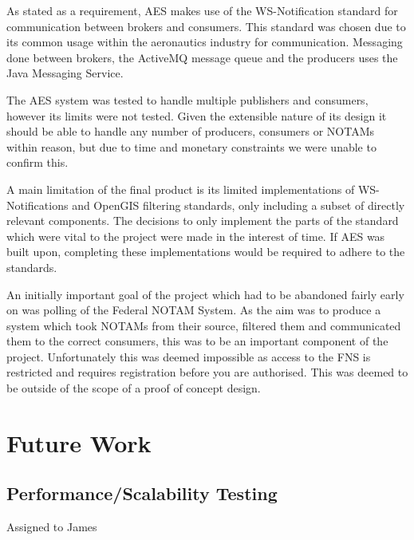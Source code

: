 \documentclass[a4paper, 12pt, twoside]{article}
\begin{document}
As stated as a requirement, AES makes use of the WS-Notification standard for communication between brokers and consumers. This standard was chosen due to its common usage within the aeronautics industry for communication. Messaging done between brokers, the ActiveMQ message queue and the producers uses the Java Messaging Service.

The AES system was tested to handle multiple publishers and consumers, however its limits were not tested. Given the extensible nature of its design it should be able to handle any number of producers, consumers or NOTAMs within reason, but due to time and monetary constraints we were unable to confirm this.

A main limitation of the final product is its limited implementations of WS-Notifications and OpenGIS filtering standards, only including a subset of directly relevant components. The decisions to only implement the parts of the standard which were vital to the project were made in the interest of time. If AES was built upon, completing these implementations would be required to adhere to the standards.

An initially important goal of the project which had to be abandoned fairly early on was polling of the Federal NOTAM System. As the aim was to produce a system which took NOTAMs from their source, filtered them and communicated them to the correct consumers, this was to be an important component of the project. Unfortunately this was deemed impossible as access to the FNS is restricted and requires registration before you are authorised. This was deemed to be outside of the scope of a proof of concept design.

\newpage

\section{Future Work}
\label{sec:future_work}

\subsection{Performance/Scalability Testing}
\label{sec:future_testing}
Assigned to James
\end{document}
